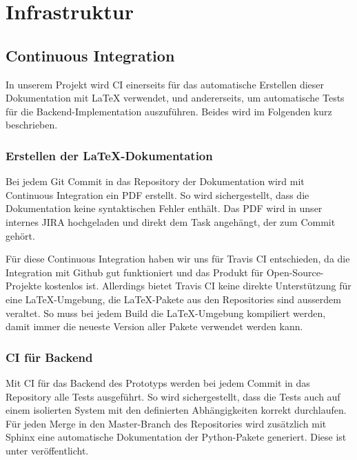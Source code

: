 
\section{Infrastruktur}
\label{sec:Infrastruktur}

\subsection{Continuous Integration}
\label{sub:Continuous Integration}

In unserem Projekt wird \ac{CI} einerseits für das automatische Erstellen dieser Dokumentation mit LaTeX verwendet, und andererseits, um automatische Tests für die Backend-Implementation auszuführen. Beides wird im Folgenden kurz beschrieben.

\subsubsection{Erstellen der LaTeX-Dokumentation}
\label{subsub:Erstellen der LaTeX-Dokumentation}

Bei jedem Git Commit in das Repository der Dokumentation \cite{github:PlazaRoute-doc} wird mit Continuous Integration ein PDF erstellt. So wird sichergestellt, dass die Dokumentation keine syntaktischen Fehler enthält. Das PDF wird in unser internes JIRA hochgeladen und direkt dem Task angehängt, der zum Commit gehört.

Für diese Continuous Integration haben wir uns für Travis CI \cite{travis-ci} entschieden, da die Integration mit Github gut funktioniert und das Produkt für Open-Source-Projekte kostenlos ist. Allerdings bietet Travis CI keine direkte Unterstützung für eine LaTeX-Umgebung, die LaTeX-Pakete aus den Repositories sind ausserdem veraltet. So muss bei jedem Build die LaTeX-Umgebung kompiliert werden, damit immer die neueste Version aller Pakete verwendet werden kann.

\subsubsection{CI für Backend}

Mit \ac{CI} für das Backend des Prototyps werden bei jedem Commit in das Repository \cite{github:PlazaRoute} alle Tests ausgeführt. So wird sichergestellt, dass die Tests auch auf einem isolierten System mit den definierten Abhängigkeiten korrekt durchlaufen. Für jeden Merge in den Master-Branch des Repositories wird zusätzlich mit Sphinx \cite{sphinx} eine automatische Dokumentation der Python-Pakete generiert. Diese ist unter \cite{PlazaRoute-apidoc} veröffentlicht.

